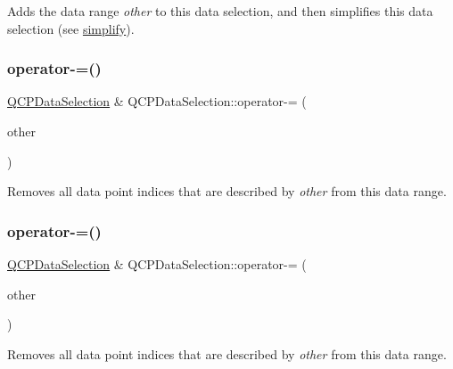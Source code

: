 Adds the data range {\itshape other} to this data selection, and then simplifies this data selection (see \mbox{\hyperlink{class_q_c_p_data_selection_a4a2fbad1a6e4d1dd26fdfdf88956f2a4}{simplify}}). \mbox{\label{class_q_c_p_data_selection_a66f9fab70b026baa64bf8e52fe5de07e}} 
\subsubsection{\texorpdfstring{operator-\/=()}{operator-=()}\hspace{0.1cm}{\footnotesize\ttfamily [1/2]}}
{\footnotesize\ttfamily \mbox{\hyperlink{class_q_c_p_data_selection}{Q\+C\+P\+Data\+Selection}} \& Q\+C\+P\+Data\+Selection\+::operator-\/= (\begin{DoxyParamCaption}\item[{const \mbox{\hyperlink{class_q_c_p_data_selection}{Q\+C\+P\+Data\+Selection}} \&}]{other }\end{DoxyParamCaption})}

Removes all data point indices that are described by {\itshape other} from this data range. \mbox{\label{class_q_c_p_data_selection_a8d18b20d20dde737eefc10967e31cf73}} 
\subsubsection{\texorpdfstring{operator-\/=()}{operator-=()}\hspace{0.1cm}{\footnotesize\ttfamily [2/2]}}
{\footnotesize\ttfamily \mbox{\hyperlink{class_q_c_p_data_selection}{Q\+C\+P\+Data\+Selection}} \& Q\+C\+P\+Data\+Selection\+::operator-\/= (\begin{DoxyParamCaption}\item[{const \mbox{\hyperlink{class_q_c_p_data_range}{Q\+C\+P\+Data\+Range}} \&}]{other }\end{DoxyParamCaption})}

Removes all data point indices that are described by {\itshape other} from this data range. \mbox{\label{class_q_c_p_data_selection_a664fa566569b17148abafd6b1dbbf347}} 
